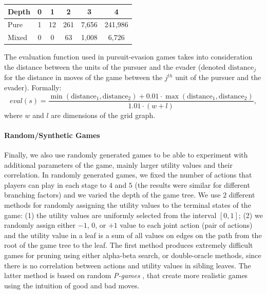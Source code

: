 \vspace{0.1cm}

\begin{center}
\small
\begin{tabular}{|l|c|c|c|c|c|}
\hline Depth & 0 & 1 & 2 & 3 & 4 \\
\hline Pure  & 1 & 12 & 261 & 7,656 & 241,986 \\
\hline Mixed & 0 & 0 & 63 & 1,008 & 6,726 \\
\hline
\end{tabular}
\end{center}

\vspace{0.1cm}

The evaluation function used in pursuit-evasion games takes into consideration the distance between the units of the pursuer and the evader (denoted $\textrm{distance}_j$ for the distance in moves of the game between the $j^{th}$ unit of the pursuer and the evader). Formally:
$$
eval(s) = \frac{\min(\textrm{distance}_1,\textrm{distance}_2) + 0.01\cdot\max(\textrm{distance}_1,\textrm{distance}_2)}{1.01 \cdot (w+l)},
$$
where $w$ and $l$ are dimensions of the grid graph.

\paragraph{\textbf{Random/Synthetic Games}}
Finally, we also use randomly generated games to be able to experiment with additional parameters of the game, mainly larger utility values and their correlation.
In randomly generated games, we fixed the number of actions that players can play in each stage to $4$ and $5$ (the results were similar for different branching factors) and we varied the depth of the game tree.
We use $2$ different methods for randomly assigning the utility values to the terminal states of the game:
(1) the utility values are uniformly selected from the interval $\left[0,1\right]$;
(2) we randomly assign either $-1$, $0$, or $+1$ value to each joint action (pair of actions) and the utility value in a leaf is a sum of all values on edges on the path from the root of the game tree to the leaf.
The first method produces extremely difficult games for pruning using either alpha-beta search, or double-oracle methods, since there is no correlation between actions and utility values in sibling leaves.
The latter method is based on random \emph{P-games} \cite{smith1995}, that create more realistic games using the intuition of good and bad moves.

